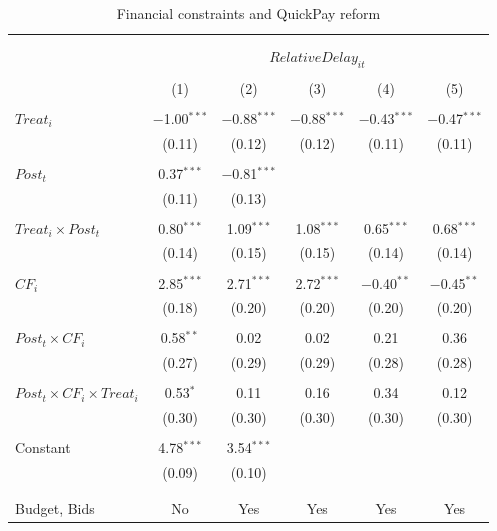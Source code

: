 \documentclass[
]{article}
\begin{document}
\begin{table}[H] \centering 
  \caption{Financial constraints and QuickPay reform} 
  \label{} 
\small 
\begin{tabular}{@{\extracolsep{-2pt}}lccccc} 
\\[-1.8ex]\hline 
\hline \\[-1.8ex] 
\\[-1.8ex] & \multicolumn{5}{c}{$RelativeDelay_{it}$} \\ 
\\[-1.8ex] & (1) & (2) & (3) & (4) & (5)\\ 
\hline \\[-1.8ex] 
 $Treat_i$ & $-$1.00$^{***}$ & $-$0.88$^{***}$ & $-$0.88$^{***}$ & $-$0.43$^{***}$ & $-$0.47$^{***}$ \\ 
  & (0.11) & (0.12) & (0.12) & (0.11) & (0.11) \\ 
  & & & & & \\ 
 $Post_t$ & 0.37$^{***}$ & $-$0.81$^{***}$ &  &  &  \\ 
  & (0.11) & (0.13) &  &  &  \\ 
  & & & & & \\ 
 $Treat_i \times Post_t$ & 0.80$^{***}$ & 1.09$^{***}$ & 1.08$^{***}$ & 0.65$^{***}$ & 0.68$^{***}$ \\ 
  & (0.14) & (0.15) & (0.15) & (0.14) & (0.14) \\ 
  & & & & & \\ 
 $CF_i$ & 2.85$^{***}$ & 2.71$^{***}$ & 2.72$^{***}$ & $-$0.40$^{**}$ & $-$0.45$^{**}$ \\ 
  & (0.18) & (0.20) & (0.20) & (0.20) & (0.20) \\ 
  & & & & & \\ 
 $Post_t \times CF_i$ & 0.58$^{**}$ & 0.02 & 0.02 & 0.21 & 0.36 \\ 
  & (0.27) & (0.29) & (0.29) & (0.28) & (0.28) \\ 
  & & & & & \\ 
 $Post_t \times CF_i \times Treat_i$ & 0.53$^{*}$ & 0.11 & 0.16 & 0.34 & 0.12 \\ 
  & (0.30) & (0.30) & (0.30) & (0.30) & (0.30) \\ 
  & & & & & \\ 
 Constant & 4.78$^{***}$ & 3.54$^{***}$ &  &  &  \\ 
  & (0.09) & (0.10) &  &  &  \\ 
  & & & & & \\ 
\hline \\[-1.8ex] 
Budget, Bids & No & Yes & Yes & Yes & Yes \\ 

\end{tabular}
\end{table}
\end{document}

